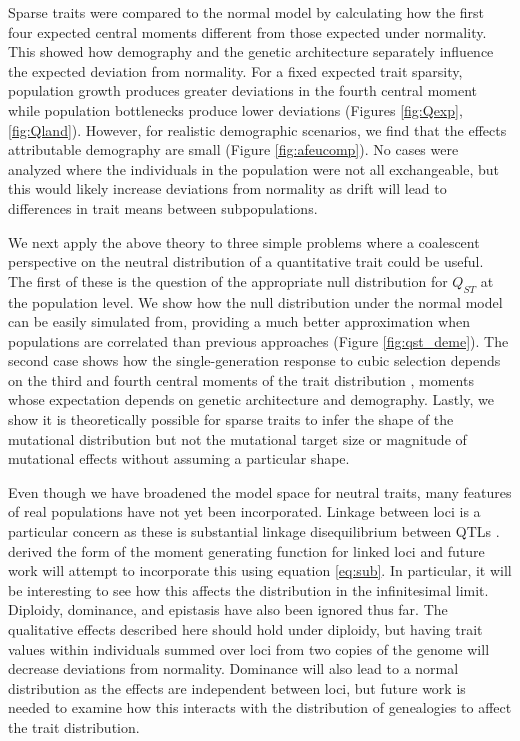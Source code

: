 Sparse traits were compared to the normal model by calculating how the first
four expected central moments different from those expected under normality.
This showed how demography and the genetic architecture separately influence the
expected deviation from normality. For a fixed expected trait sparsity,
population growth produces greater deviations in the fourth central moment while
population bottlenecks produce lower deviations (Figures
\ref{fig:Qexp},\ref{fig:Qland}). However, for realistic demographic scenarios,
we find that the effects attributable demography are small (Figure
\ref{fig:afeucomp}). No cases were analyzed where the individuals in the
population were not all exchangeable, but this would likely increase deviations
from normality as drift will lead to differences in trait means between
subpopulations.

We next apply the above theory to three simple problems where a coalescent
perspective on the neutral distribution of a quantitative trait could be useful.
The first of these is the question of the appropriate null distribution for
$Q_{ST}$ at the population level. We show how the null distribution under the
normal model can be easily simulated from, providing a much better approximation
when populations are correlated than previous approaches \citep{Whitlock2009}
(Figure \ref{fig:qst_deme}). The second case shows how the single-generation
response to cubic selection depends on the third and fourth central moments of
the trait distribution \citep{Turelli1990}, moments whose expectation depends on
genetic architecture and demography. Lastly, we show it is theoretically
possible for sparse traits to infer the shape of the mutational distribution but
not the mutational target size or magnitude of mutational effects without
assuming a particular shape.

Even though we have broadened the model space for neutral traits, many features
of real populations have not yet been incorporated. Linkage between loci is a
particular concern as these is substantial linkage disequilibrium between QTLs
\citep{Bulik-Sullivan2015}. \citet{Lohse2011} derived the form of the moment
generating function for linked loci and future work will attempt to incorporate
this using equation \eqref{eq:sub}. In particular, it will be interesting to see
how this affects the distribution in the infinitesimal limit. Diploidy,
dominance, and epistasis have also been ignored thus far. The qualitative
effects described here should hold under diploidy, but having trait values
within individuals summed over loci from two copies of the genome will decrease
deviations from normality. Dominance will also lead to a normal distribution as
the effects are independent between loci, but future work is needed to examine
how this interacts with the distribution of genealogies to affect the trait
distribution.

